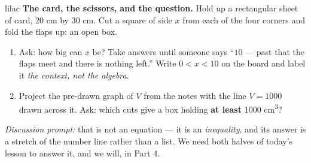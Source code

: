 \documentclass[10pt]{article}
\begin{document}
\begin{skillbox}[Hook]{lilac}
    \textbf{The card, the scissors, and the question.} Hold up a rectangular
    sheet of card, $20$ cm by $30$ cm. Cut a square of side $x$ from each of
    the four corners and fold the flaps up: an open box.
    \begin{enumerate}[itemsep=2pt]
        \item Ask: how big can $x$ be? Take answers until someone says
              ``$10$ --- past that the flaps meet and there is nothing left.''
              Write $0 < x < 10$ on the board and label it \textit{the context,
              not the algebra}.
        \item Project the pre-drawn graph of $V$ from the notes with the line
              $V = 1000$ drawn across it. Ask: which cuts give a box holding
              \textbf{at least} $1000$ cm\textsuperscript{3}?
    \end{enumerate}
    \textit{Discussion prompt:} that is not an equation --- it is an
    \textit{inequality}, and its answer is a stretch of the number line rather
    than a list. We need both halves of today's lesson to answer it, and we
    will, in Part 4.
\end{skillbox}
\end{document}
